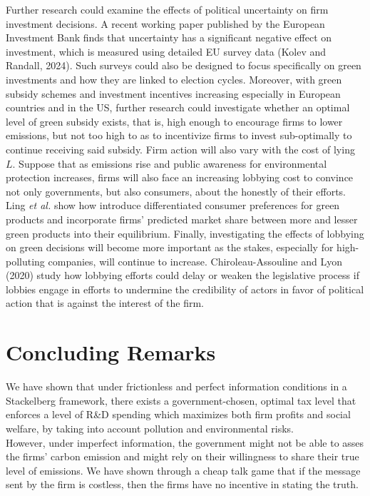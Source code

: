 \documentclass{article}
\begin{document}
Further research could examine the effects of political uncertainty on firm investment decisions. A recent working paper published by the European Investment Bank finds that uncertainty has a significant negative effect on investment, which is measured using detailed EU survey data (Kolev and Randall, 2024). Such surveys could also be designed to focus specifically on green investments and how they are linked to election cycles. Moreover, with green subsidy schemes and investment incentives increasing especially in European countries and in the US, further research could investigate whether an optimal  level of green subsidy exists, that is, high enough to encourage firms to lower emissions, but not too high to as to incentivize firms to invest sub-optimally to continue receiving said subsidy. Firm action will also vary with the cost of lying $L$. Suppose that as emissions rise and public awareness for environmental protection increases, firms will also face an increasing lobbying cost to convince not only governments, but also consumers, about the honestly of their efforts. Ling \textit{et al.} show how introduce differentiated consumer preferences for green products and incorporate firms' predicted market share between more and lesser green products into their equilibrium. Finally, investigating the effects of lobbying on green decisions will become more important as the stakes, especially for high-polluting companies, will continue to increase. Chiroleau-Assouline and Lyon (2020) study how lobbying efforts could delay or weaken the legislative process if lobbies engage in efforts to undermine the credibility of actors in favor of political action that is against the interest of the firm.

\pagebreak

\section{Concluding Remarks}
We have shown that under frictionless and perfect information conditions in a Stackelberg framework, there exists a government-chosen, optimal tax level that enforces a level of R\&D spending which maximizes both firm profits and social welfare, by taking into account pollution and environmental risks. \\

However, under imperfect information, the government might not be able to asses the firms' carbon emission and might rely on their willingness to share their true level of emissions. We have shown through a cheap talk game that if the message sent by the firm is costless, then the firms have no incentive in stating the truth. \\
\end{document}
